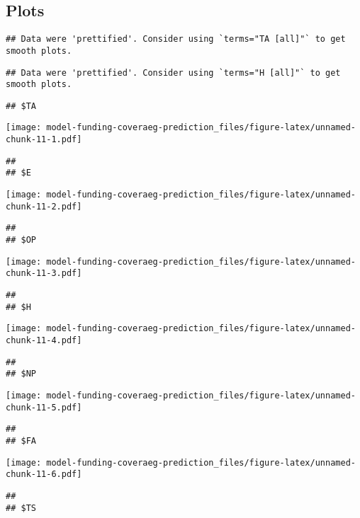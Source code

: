 \documentclass[]{article}
\begin{document}
\hypertarget{plots-1}{%
\subsection{Plots}\label{plots-1}}

\begin{verbatim}
## Data were 'prettified'. Consider using `terms="TA [all]"` to get smooth plots.
\end{verbatim}

\begin{verbatim}
## Data were 'prettified'. Consider using `terms="H [all]"` to get smooth plots.
\end{verbatim}

\begin{verbatim}
## $TA
\end{verbatim}

\texttt{[image: model-funding-coveraeg-prediction\_files/figure-latex/unnamed-chunk-11-1.pdf]}

\begin{verbatim}
## 
## $E
\end{verbatim}

\texttt{[image: model-funding-coveraeg-prediction\_files/figure-latex/unnamed-chunk-11-2.pdf]}

\begin{verbatim}
## 
## $OP
\end{verbatim}

\texttt{[image: model-funding-coveraeg-prediction\_files/figure-latex/unnamed-chunk-11-3.pdf]}

\begin{verbatim}
## 
## $H
\end{verbatim}

\texttt{[image: model-funding-coveraeg-prediction\_files/figure-latex/unnamed-chunk-11-4.pdf]}

\begin{verbatim}
## 
## $NP
\end{verbatim}

\texttt{[image: model-funding-coveraeg-prediction\_files/figure-latex/unnamed-chunk-11-5.pdf]}

\begin{verbatim}
## 
## $FA
\end{verbatim}

\texttt{[image: model-funding-coveraeg-prediction\_files/figure-latex/unnamed-chunk-11-6.pdf]}

\begin{verbatim}
## 
## $TS
\end{verbatim}
\end{document}
